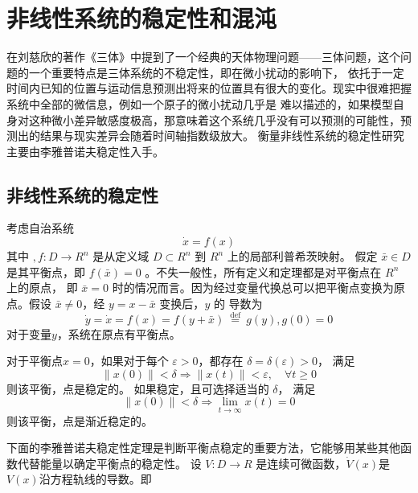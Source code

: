 \section{非线性系统的稳定性和混沌}
在刘慈欣的著作《三体》中提到了一个经典的天体物理问题——三体问题，这个问题的一个重要特点是三体系统的不稳定性，即在微小扰动的影响下，
依托于一定时间内已知的位置与运动信息预测出将来的位置具有很大的变化。现实中很难把握系统中全部的微信息，例如一个原子的微小扰动几乎是
难以描述的，如果模型自身对这种微小差异敏感度极高，那意味着这个系统几乎没有可以预测的可能性，预测出的结果与现实差异会随着时间轴指数级放大。
衡量非线性系统的稳定性研究主要由李雅普诺夫稳定性入手。
\subsection{非线性系统的稳定性}
考虑自治系统
\begin{equation}
    \dot{x}=f(x)
\end{equation}
其中 $,f: D \rightarrow R^n$ 是从定义域 $D \subset R^n$ 到 $R^n$ 上的局部利普希茨映射。
假定 $\bar{x} \in D$ 是其平衡点，即 $f(\bar{x})=0$ 。不失一般性，所有定义和定理都是对平衡点在 $R^n$ 上的原点，
即 $\bar{x}=0$ 时的情况而言。因为经过变量代换总可以把平衡点变换为原点。假设 $\bar{x} \neq 0$，经 $y=x-\bar{x}$ 变换后，$y$ 的
导数为
\begin{equation}
    \dot{y}=\dot{x}=f(x)=f(y+\bar{x}) \stackrel{\text { def }}{=} g(y),g(0)=0
\end{equation}
对于变量$y$，系统在原点有平衡点。
\begin{definition}
    对于平衡点$x=0$，如果对于每个 $\varepsilon>0$，都存在 $\delta=\delta(\varepsilon)>0$， 满足
    \begin{equation}
        \|x(0)\|<\delta \Rightarrow\|x(t)\|<\varepsilon,\quad \forall t \geqslant 0
    \end{equation}
    则该平衡，点是稳定的。
    如果稳定，且可选择适当的 $\delta$， 满足
    \begin{equation}
        \|x(0)\|<\delta \Rightarrow \lim _{t \rightarrow \infty} x(t)=0
    \end{equation}
    则该平衡，点是渐近稳定的。
\end{definition}
下面的李雅普诺夫稳定性定理是判断平衡点稳定的重要方法，它能够用某些其他函数代替能量以确定平衡点的稳定性。
设 $V: D \rightarrow R$ 是连续可微函数，$\dot{V}(x)$是$V(x)$沿方程轨线的导数。即
